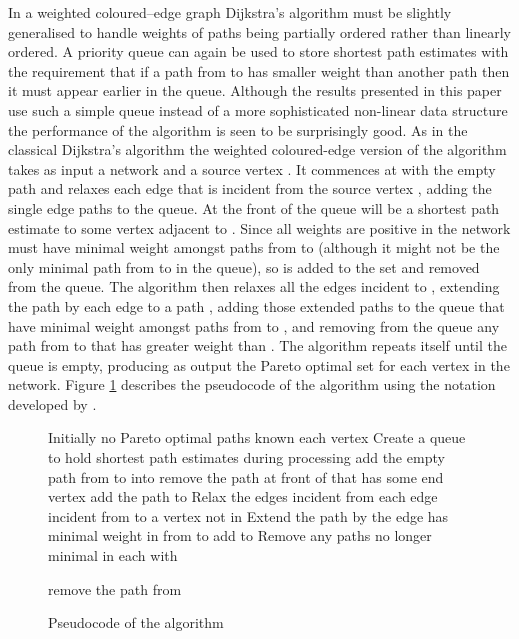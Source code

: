\documentclass[preprint,authoryear,12pt]{elsarticle}
\begin{document}
In a weighted coloured--edge graph Dijkstra's algorithm must be slightly
generalised to handle weights of paths being partially ordered rather
than linearly ordered.
A priority queue  can again be used to store shortest path estimates
with the requirement that if a path  from  to  has smaller
weight than another path  then it must appear earlier in the queue.
Although the results presented in this paper use such a simple queue instead
of a more sophisticated non-linear data structure the performance
of the algorithm is seen to be surprisingly good.
As in the classical Dijkstra's algorithm the weighted coloured-edge version of
the algorithm takes as input a network  and a source vertex .
It commences at  with the empty path  and relaxes each edge that is incident
from the source vertex , adding the single edge paths to the queue.
At the front of the queue will be a shortest path estimate 
to some vertex  adjacent to .
Since all weights are positive in the
network  must have minimal weight amongst paths from  to 
(although it might not be the only minimal path from  to  in the queue),
so  is added to the set  and removed from the queue.
The algorithm then relaxes all the edges incident to ,
extending the path  by each edge to a path ,
adding those extended paths  to the queue that have minimal weight
amongst paths from  to , and removing from the queue any path 
from  to  that has greater weight than .
The algorithm repeats itself until the queue is empty, producing as output
the Pareto optimal set  for each vertex  in the network.
Figure \ref{pseudo} describes the pseudocode of the algorithm
using the notation developed by \cite{cormen01}.
\begin{figure}[t]
\begin{small}
\begin{codebox}
\Procname{}
\li \Comment Initially no Pareto optimal paths known
\li \For each vertex 
\li \Do 
    \End
\li \Comment Create a queue  to hold shortest path estimates during processing
\li 
\li add the empty path  from  to  into 
\li \While 
\li \Do remove the path  at front of  that has some end vertex 
\li     add the path  to 
\li     \Comment Relax the edges incident from 
\li     \For each edge  incident from  to a vertex  not in 
\li     \Do \Comment Extend the path  by the edge 
\li         
\li         \If  has minimal weight in  from  to 
\li         \Then add  to 
\li             \Comment Remove any paths no longer minimal in 
\li             \For each  with
                   
\li             \Do remove the path  from 
                \End
            \End
        \End
    \End
\li \Return 
\end{codebox}
\end{small}
\caption{Pseudocode of the algorithm}
\label{pseudo}
\end{figure}
\end{document}
